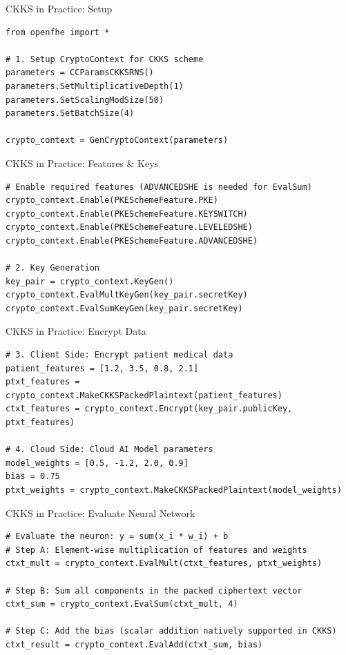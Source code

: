 \documentclass[aspectratio=169, 10pt]{beamer}
\begin{document}
\begin{frame}[fragile]{CKKS in Practice: Setup}
\vspace{0.1cm}
\begin{lstlisting}[firstnumber=1]
from openfhe import *

# 1. Setup CryptoContext for CKKS scheme
parameters = CCParamsCKKSRNS()
parameters.SetMultiplicativeDepth(1)
parameters.SetScalingModSize(50)
parameters.SetBatchSize(4)

crypto_context = GenCryptoContext(parameters)
\end{lstlisting}
\end{frame}

\begin{frame}[fragile]{CKKS in Practice: Features \& Keys}
\vspace{0.1cm}
\begin{lstlisting}[firstnumber=11]
# Enable required features (ADVANCEDSHE is needed for EvalSum)
crypto_context.Enable(PKESchemeFeature.PKE)
crypto_context.Enable(PKESchemeFeature.KEYSWITCH)
crypto_context.Enable(PKESchemeFeature.LEVELEDSHE)
crypto_context.Enable(PKESchemeFeature.ADVANCEDSHE)

# 2. Key Generation
key_pair = crypto_context.KeyGen()
crypto_context.EvalMultKeyGen(key_pair.secretKey)
crypto_context.EvalSumKeyGen(key_pair.secretKey)
\end{lstlisting}
\end{frame}
\begin{frame}[fragile]{CKKS in Practice: Encrypt Data}
\vspace{0.1cm}
\begin{lstlisting}[firstnumber=21]
# 3. Client Side: Encrypt patient medical data
patient_features = [1.2, 3.5, 0.8, 2.1]
ptxt_features = crypto_context.MakeCKKSPackedPlaintext(patient_features)
ctxt_features = crypto_context.Encrypt(key_pair.publicKey, ptxt_features)

# 4. Cloud Side: Cloud AI Model parameters
model_weights = [0.5, -1.2, 2.0, 0.9]
bias = 0.75
ptxt_weights = crypto_context.MakeCKKSPackedPlaintext(model_weights)
\end{lstlisting}
\end{frame}

\begin{frame}[fragile]{CKKS in Practice: Evaluate Neural Network}
\vspace{0.1cm}
\begin{lstlisting}[firstnumber=30]
# Evaluate the neuron: y = sum(x_i * w_i) + b
# Step A: Element-wise multiplication of features and weights
ctxt_mult = crypto_context.EvalMult(ctxt_features, ptxt_weights)

# Step B: Sum all components in the packed ciphertext vector
ctxt_sum = crypto_context.EvalSum(ctxt_mult, 4)

# Step C: Add the bias (scalar addition natively supported in CKKS)
ctxt_result = crypto_context.EvalAdd(ctxt_sum, bias)
\end{lstlisting}
\end{frame}
\end{document}
